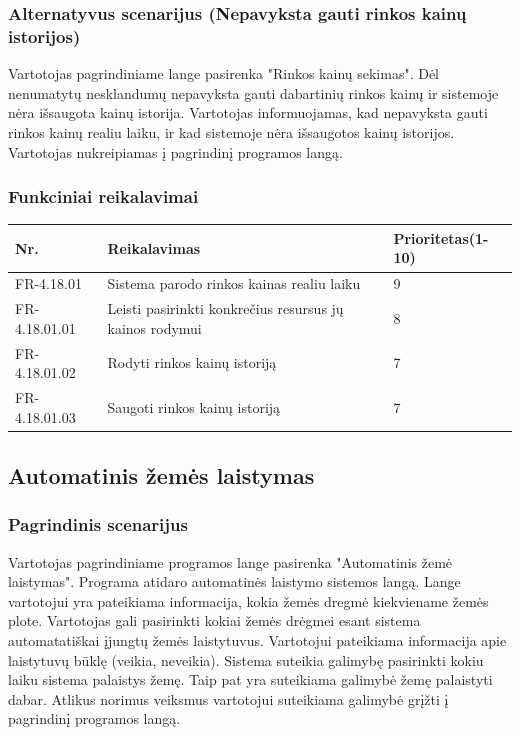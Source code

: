 \documentclass[oneside]{VUMIFPSkursinis}
\begin{document}
	\subsubsection{Alternatyvus scenarijus (Nepavyksta gauti rinkos kainų istorijos)}
	Vartotojas pagrindiniame lange pasirenka "Rinkos kainų sekimas". Dėl nenumatytų nesklandumų nepavyksta gauti dabartinių rinkos kainų ir sistemoje nėra išsaugota kainų istorija. Vartotojas informuojamas, kad nepavyksta gauti rinkos kainų realiu laiku, ir kad sistemoje nėra išsaugotos kainų istorijos. Vartotojas nukreipiamas į pagrindinį programos langą.
	\subsubsection{Funkciniai reikalavimai}
\begin{table}[htbp]
	\begin{tabularx}{1\textwidth}{ |P{2.5cm}|X|P{3cm }| } \hline
		Nr. & Reikalavimas & Prioritetas(1-10) \\ \hline
		FR-4.18.01 & Sistema parodo rinkos kainas realiu laiku &  9 \\ \hline
		FR-4.18.01.01 & Leisti pasirinkti konkrečius resursus jų kainos rodymui & 8 \\ \hline
		FR-4.18.01.02 & Rodyti rinkos kainų istoriją & 7 \\ \hline
		FR-4.18.01.03 & Saugoti rinkos kainų istoriją & 7 \\ \hline
	
	\end{tabularx}
\end{table}
	 
\subsection{Automatinis žemės laistymas}
	\subsubsection{Pagrindinis scenarijus}
	Vartotojas pagrindiniame programos lange pasirenka "Automatinis žemė laistymas". Programa atidaro automatinės laistymo sistemos langą. Lange vartotojui yra pateikiama informacija, kokia žemės dregmė kiekviename žemės plote. Vartotojas gali pasirinkti kokiai žemės drėgmei esant sistema automatatiškai įjungtų žemės laistytuvus. Vartotojui pateikiama informacija apie laistytuvų būklę (veikia, neveikia). Sistema suteikia galimybę pasirinkti kokiu laiku sistema palaistys žemę. Taip pat yra suteikiama galimybė žemę palaistyti dabar. Atlikus norimus veiksmus vartotojui suteikiama galimybė grįžti į pagrindinį programos langą.
\end{document}
